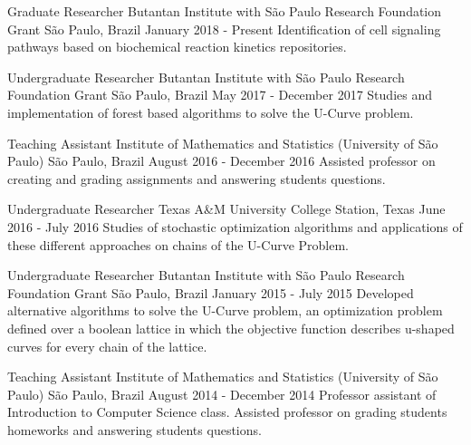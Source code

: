 \documentclass[11pt, a4paper]{awesome-cv-res}
\begin{document}
\begin{cventries}
\cventry
{Graduate Researcher}
{Butantan Institute with São Paulo Research Foundation Grant}
{São Paulo, Brazil}
{January 2018 - Present}
{Identification of cell signaling pathways based on biochemical reaction 
    kinetics repositories.}
\newline
\newline

\cventry
{Undergraduate Researcher}
{Butantan Institute with São Paulo Research Foundation Grant}
{São Paulo, Brazil}
{May 2017 - December 2017}
{Studies and implementation of forest based algorithms to solve the 
    U-Curve problem.}
\newline
\newline

\cventry
{Teaching Assistant}
{Institute of Mathematics and Statistics (University of São Paulo)}
{São Paulo, Brazil}
{August 2016 - December 2016}
{Assisted professor on creating and grading assignments and answering 
    students questions.}
\newline 
\newline 

\cventry
{Undergraduate Researcher}
{Texas A\&M University}
{College Station, Texas}
{June 2016 - July 2016}
{Studies of stochastic optimization algorithms and applications of these
    different approaches on chains of the U-Curve Problem.}
\newline 
\newline 

\cventry
{Undergraduate Researcher}
{Butantan Institute with São Paulo Research Foundation Grant}
{São Paulo, Brazil}
{January 2015 - July 2015}
{Developed alternative algorithms to solve the U-Curve problem, an 
    optimization problem defined over a boolean lattice in which the 
    objective function describes u-shaped curves for every chain of the 
    lattice.}
\newline
\newline

\cventry
{Teaching Assistant}
{Institute of Mathematics and Statistics (University of São Paulo)}
{São Paulo, Brazil}
{August 2014 - December 2014}
{Professor assistant of Introduction to Computer Science class. Assisted
    professor on grading students homeworks and answering students 
    questions.}
\end{cventries}
\end{document}
